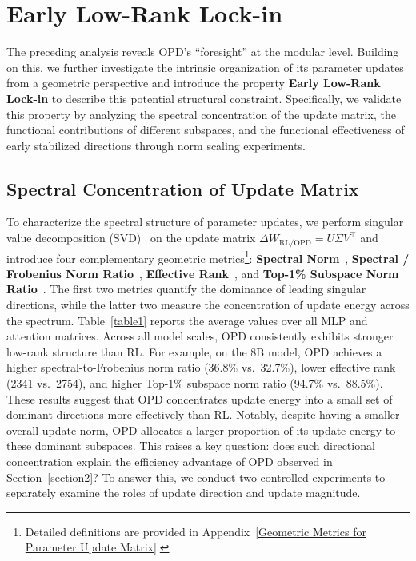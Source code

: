 \documentclass{article}
\begin{document}
\section{Early Low-Rank Lock-in}
\label{section3}

The preceding analysis reveals OPD's ``foresight'' at the modular level. Building on this, we further investigate the intrinsic organization of its parameter updates from a geometric perspective and introduce the property \textbf{Early Low-Rank Lock-in} to describe this potential structural constraint. Specifically, we validate this property by analyzing the spectral concentration of the update matrix, the functional contributions of different subspaces, and the functional effectiveness of early stabilized directions through norm scaling experiments.

\subsection{Spectral Concentration of Update Matrix}
\label{Spectral Concentration of Update Matrix}
To characterize the spectral structure of parameter updates, we perform singular value decomposition (SVD)~\citep{5197422} on the update matrix $\Delta W_{\mathrm{RL/OPD}} = U\Sigma V^\top$ and introduce four complementary geometric metrics\footnote{Detailed definitions are provided in Appendix~\ref{Geometric Metrics for Parameter Update Matrix}.}: \textbf{Spectral Norm}~\citep{MATHIAS1990269}, \textbf{Spectral / Frobenius Norm Ratio}~\citep{ALNATOOR2024e30056}, \textbf{Effective Rank}~\citep{item_f3c74b8f1cad43ed869604b318d58703}, and \textbf{Top-1\% Subspace Norm Ratio}~\citep{cai2025predictability}. The first two metrics quantify the dominance of leading singular directions, while the latter two measure the concentration of update energy across the spectrum. Table~\ref{table1} reports the average values over all MLP and attention matrices. Across all model scales, OPD consistently exhibits stronger low-rank structure than RL. For example, on the 8B model, OPD achieves a higher spectral-to-Frobenius norm ratio (36.8\% vs.\ 32.7\%), lower effective rank (2341 vs.\ 2754), and higher Top-1\% subspace norm ratio (94.7\% vs.\ 88.5\%). These results suggest that OPD concentrates update energy into a small set of dominant directions more effectively than RL. Notably, despite having a smaller overall update norm, OPD allocates a larger proportion of its update energy to these dominant subspaces. This raises a key question: does such directional concentration explain the efficiency advantage of OPD observed in Section~\ref{section2}? To answer this, we conduct two controlled experiments to separately examine the roles of update direction and update magnitude.
\end{document}
